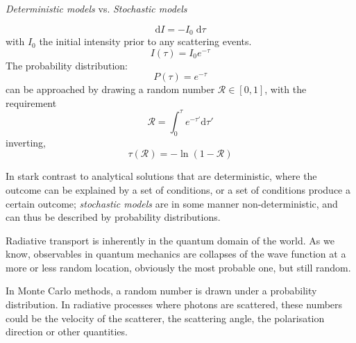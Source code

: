 \documentclass[ignorenonframetext]{beamer}
\newcommand{\diff}{\ensuremath{\; \text{d}}}
\newcommand{\diffd}{\ensuremath{\text{d}}}
\begin{document}
\begin{frame}

\begin{center}
    \textit{Deterministic models}   \quad vs. \quad \textit{Stochastic models}
\end{center}

\pause \begin{equation}
    \diffd I = -I_0 \diff \tau
    \label{eq:diffIntensity}
\end{equation}
with $I_0$ the initial intensity prior to any scattering events. 
\pause \begin{equation}
    I(\tau) = I_0 e^{-\tau}
    \label{eq:intensity}
\end{equation}
\pause The probability distribution:
\begin{equation}
    P(\tau) = e^{-\tau}
    \label{eq:ptau}
\end{equation}
\pause can be approached by drawing a random number $\mathcal{R} \in [0,1]$, with the requirement
\begin{equation}
    \mathcal{R} = \int_{0}^{\tau} e^{-\tau'} \diffd \tau'
    \label{eq:R_req}
\end{equation}
inverting,
\begin{equation}
    \tau(\mathcal{R}) = -\ln \left( 1- \mathcal{R} \right)
    \label{eq:randtau}
\end{equation}
\end{frame}

In stark contrast to analytical solutions that are deterministic, where the outcome can be explained by a set of conditions, or a set of conditions produce a certain outcome; \textit{stochastic models} are in some manner non-deterministic, and can thus be described by probability distributions. 

Radiative transport is inherently in the quantum domain of the world. As we know, observables in quantum mechanics are collapses of the wave function at a more or less random location, obviously the most probable one, but still random. 

In Monte Carlo methods, a random number is drawn under a probability distribution.  In radiative processes where photons are scattered, these numbers could be the velocity of the scatterer, the scattering angle, the polarisation direction or other quantities. 
\end{document}
